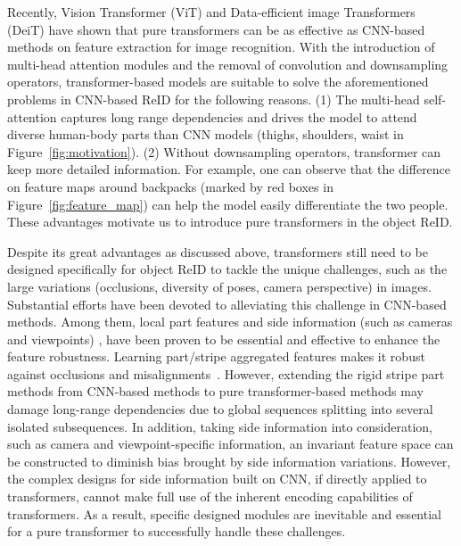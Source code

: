 \documentclass[10pt,twocolumn,letterpaper]{article}
\begin{document}
Recently, Vision Transformer (ViT) \cite{ViT} and Data-efficient image Transformers (DeiT) \cite{touvron2020training} have shown that pure transformers can be as effective as CNN-based methods on feature extraction for image recognition. With the introduction of multi-head attention modules and the removal of convolution and downsampling operators, transformer-based models are suitable to solve the aforementioned problems in CNN-based ReID for the following reasons.  (1) The multi-head self-attention captures long range dependencies and drives the model to attend diverse human-body parts than CNN models (\eg thighs, shoulders, waist in Figure~\ref{fig:motivation}).
(2) Without downsampling operators, transformer can keep more detailed information. For example, one can observe that the difference on feature maps around backpacks (marked by red boxes in Figure~\ref{fig:feature_map}) can help the model easily differentiate the two people. 
 These advantages motivate us to introduce pure transformers in the object ReID. 



Despite its great advantages as discussed above, transformers still need to be designed specifically for object ReID to tackle the unique challenges, such as the large variations (\eg occlusions, diversity of poses, camera perspective) in images. 
Substantial efforts have been devoted to alleviating this challenge in CNN-based methods. Among them, local part features \cite{PCB, MGN,MSCAN,DPL, luo2019alignedreid++} and side information (such as cameras and viewpoints) \cite{chu2019vehicle, camera-bn,personX, PVEN}, have been proven to be essential and effective to enhance the feature robustness. Learning part/stripe aggregated features makes it robust against occlusions and misalignments~\cite{reid_survey}. However, extending the rigid stripe part methods from CNN-based methods to pure transformer-based methods may damage long-range dependencies due to global sequences splitting into several isolated subsequences. In addition, taking side information into consideration, such as camera and viewpoint-specific information, an invariant feature space can be constructed to diminish bias brought by side information variations. However, the complex designs for side information built on CNN, if directly applied to transformers, cannot make full use of the inherent encoding capabilities of transformers. As a result, specific designed modules are inevitable and essential for a pure transformer to successfully handle these challenges.
\end{document}
